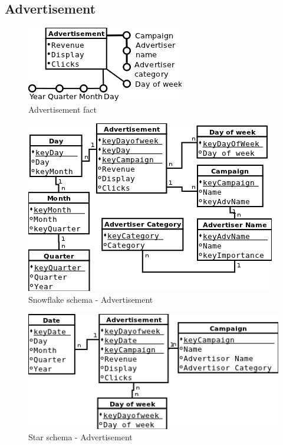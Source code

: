 \subsection*{Advertisement} 
\begin{figure}[!hbp]
  \includegraphics[scale=0.5]{fact_advertisement}
\caption{\label{pic:f_adv}  Advertisement fact}
\end{figure}

\begin{figure}[!hbp]
    \includegraphics[scale=0.5]{schema_snowflake_advertisement}
\caption{\label{pic:sn_adv} Snowflake schema - Advertisement}
\end{figure}

\begin{figure}[!hbp]
    \includegraphics[scale=0.5]{schema_star_advertisement}
\caption{\label{pic:st_adv} Star schema - Advertisement}
\end{figure}

